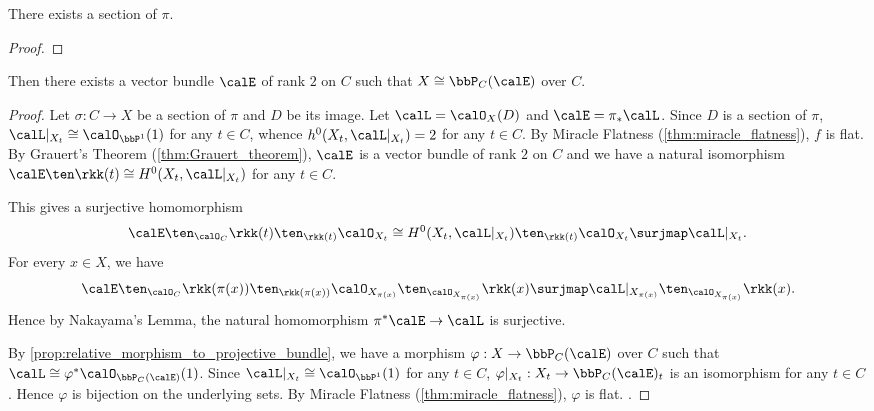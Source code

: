     \begin{lemma}\label{lem:existence_of_section_of_ruled_surface}
        There exists a section of \(\pi\).
    \end{lemma}
    \begin{proof}
    \end{proof}

    \begin{proposition}\label{prop:ruled_surface_as_projective_bundle}
        Then there exists a vector bundle \(\calE\) of rank \(2\) on \(C\) such that \(X \cong \bbP_C(\calE)\) over \(C\).
    \end{proposition}
    \begin{proof}
        Let \(\sigma:C \to X\) be a section of \(\pi\) and \(D\) be its image.
        Let \(\calL = \calO_X(D)\) and \(\calE = \pi_*\calL\).
        Since \(D\) is a section of \(\pi\), \(\calL|_{X_t} \cong \calO_{\bbP^1}(1)\) for any \(t \in C\), whence \(h^0(X_t,\calL|_{X_t}) = 2\) for any \(t \in C\).
        By Miracle Flatness (\cref{thm:miracle_flatness}), \(f\) is flat.
        By Grauert's Theorem (\cref{thm:Grauert_theorem}), \(\calE\) is a vector bundle of rank \(2\) on \(C\) and we have a natural isomorphism \(\calE \ten \rkk(t) \cong H^0(X_t,\calL|_{X_t})\) for any \(t \in C\).

        This gives a surjective homomorphism 
        \[ \calE \ten_{\calO_C} \rkk(t) \ten_{\rkk(t)} \calO_{X_t} \cong H^0(X_t,\calL|_{X_t}) \ten_{\rkk(t)} \calO_{X_t} \surjmap \calL|_{X_t}. \]
        For every \(x \in X\), we have 
        \[ \calE \ten_{\calO_C} \rkk(\pi(x)) \ten_{\rkk(\pi(x))} \calO_{X_{\pi(x)}} \ten_{\calO_{X_{\pi(x)}}} \rkk(x)  \surjmap \calL|_{X_{\pi(x)}}\ten_{\calO_{X_{\pi(x)}}} \rkk(x). \]
        Hence by Nakayama's Lemma, the natural homomorphism \(\pi^*\calE \to \calL\) is surjective.

        By \cref{prop:relative_morphism_to_projective_bundle}, we have a morphism \(\varphi:X \to \bbP_C(\calE)\) over \(C\) such that \(\calL \cong \varphi^*\calO_{\bbP_C(\calE)}(1)\).
        Since \(\calL|_{X_t} \cong \calO_{\bbP^1}(1)\) for any \(t \in C\), \(\varphi|_{X_t}:X_t \to \bbP_C(\calE)_t\) is an isomorphism for any \(t \in C\).
        Hence \(\varphi\) is bijection on the underlying sets.
        By Miracle Flatness (\cref{thm:miracle_flatness}), \(\varphi\) is flat.
        .
    \end{proof}


